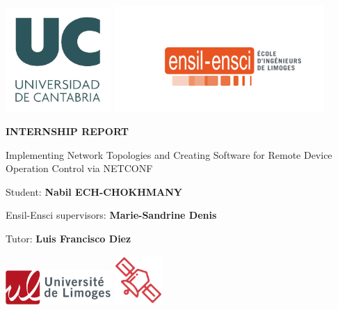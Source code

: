 \begin{titlepage}
    \begin{center}
        \includegraphics[width=0.3\textwidth]{Images/UC_logo.jpg} \hfill
        \includegraphics[width=0.6\textwidth]{Images/ENSIL2.png}
        

        \vspace*{2cm}
        
            
        \Huge
        \textbf{INTERNSHIP REPORT}
            
        \vspace{1.5cm}
            
        \Huge
        Implementing Network Topologies and Creating Software for Remote Device Operation Control via NETCONF
                    
        \vspace{2cm}
            
        
        \large
        Student:
        \textbf{Nabil ECH-CHOKHMANY}

        \vspace{0.5cm}
        
        Ensil-Ensci supervisors:
        \textbf{Marie-Sandrine Denis}

        \vspace{0.5cm}
        Tutor:
        \textbf{Luis Francisco Diez}

\vspace{2cm}

        \includegraphics[width=0.3\textwidth]{Images/unilim.png} \hfill
        \includegraphics[width=0.14\textwidth]{Images/ELT.png}



            
    \end{center}
\end{titlepage}